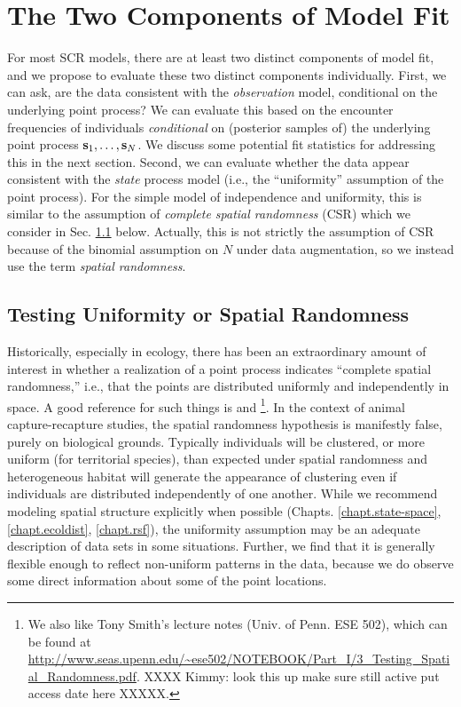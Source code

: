 \section{The Two Components of Model Fit}

For most SCR models, there are at least two distinct components of
model fit, and we propose to evaluate these two distinct components
individually.  First, we can ask, are the data consistent with the
 {\it
  observation} model, conditional on the underlying point process?
We can evaluate this based on the encounter frequencies of individuals
{\it conditional} on (posterior samples of) the underlying point
process ${\bf s}_{1}, \ldots, {\bf s}_{N}$.  We discuss some potential
fit statistics for addressing this in the next section.  Second, we
can evaluate whether the data appear consistent with the
{\it state} process model (i.e., the ``uniformity'' assumption of 
the point process).  For the simple
model of independence and uniformity, this is similar to the
assumption of {\it complete spatial randomness} (CSR) which we
consider in Sec. \ref{gof.sec.csr} below. Actually, this is not
strictly the assumption of CSR because of the binomial assumption on
$N$ under data augmentation, so we instead use the term {\it spatial
  randomness}.


\subsection{Testing Uniformity or Spatial Randomness}
\label{gof.sec.csr}


Historically, especially in ecology, there has been an extraordinary
amount of interest in whether a realization of a point process
indicates ``complete spatial randomness,'' i.e., that the points are
distributed uniformly and independently in space.  A good reference
for such things is \citet[][Ch. 8]{cressie:1992} and
\citet{illian_etal:2008}\footnote{We also like Tony Smith's lecture
  notes (Univ. of Penn. ESE 502), which can be found at
  \url{http://www.seas.upenn.edu/~ese502/NOTEBOOK/Part_I/3_Testing_Spatial_Randomness.pdf}.
  XXXX
Kimmy: look this up make sure still active put access date here
  XXXXX.  }. In the context of animal capture-recapture studies, the
spatial randomness hypothesis is manifestly false, purely on
biological grounds. Typically individuals will be clustered, or more
uniform (for territorial species), than expected under spatial
randomness and heterogeneous habitat will generate the appearance of
clustering even if individuals are distributed independently of one
another. While we recommend modeling spatial structure explicitly when
possible (Chapts. \ref{chapt.state-space}, \ref{chapt.ecoldist},
\ref{chapt.rsf}), the uniformity assumption may be an adequate
description of data sets in some situations. Further, we find that it
is generally flexible enough to reflect non-uniform patterns in the
data, because we do observe some direct information about some of the point locations.


